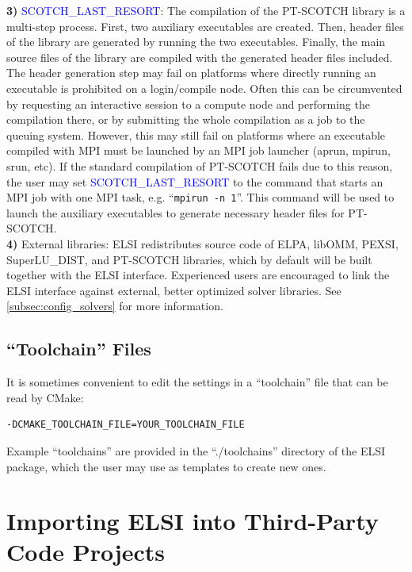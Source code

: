 \documentclass{report}
\begin{document}
\textbf{3)} \textcolor{blue}{SCOTCH\_LAST\_RESORT}:  The compilation of the PT-SCOTCH library is a multi-step process.  First, two auxiliary executables are created.  Then, header files of the library are generated by running the two executables.  Finally, the main source files of the library are compiled with the generated header files included.  The header generation step may fail on platforms where directly running an executable is prohibited on a login/compile node.  Often this can be circumvented by requesting an interactive session to a compute node and performing the compilation there, or by submitting the whole compilation as a job to the queuing system.  However, this may still fail on platforms where an executable compiled with MPI must be launched by an MPI job launcher (aprun, mpirun, srun, etc).  If the standard compilation of PT-SCOTCH fails due to this reason, the user may set \textcolor{blue}{SCOTCH\_LAST\_RESORT} to the command that starts an MPI job with one MPI task, e.g. ``\verb+mpirun -n 1+''.  This command will be used to launch the auxiliary executables to generate necessary header files for PT-SCOTCH.\\

\textbf{4)} External libraries:  ELSI redistributes source code of ELPA, libOMM, PEXSI, SuperLU\_DIST, and PT-SCOTCH libraries, which by default will be built together with the ELSI interface.  Experienced users are encouraged to link the ELSI interface against external, better optimized solver libraries.  See \ref{subsec:config_solvers} for more information.\\

\subsection{``Toolchain'' Files}
\label{subsec:config_toolchain}
It is sometimes convenient to edit the settings in a ``toolchain'' file that can be read by CMake:
\begin{verbatim}
-DCMAKE_TOOLCHAIN_FILE=YOUR_TOOLCHAIN_FILE
\end{verbatim}

Example ``toolchains'' are provided in the ``./toolchains'' directory of the ELSI package, which the user may use as templates to create new ones.\\

\section{Importing ELSI into Third-Party Code Projects}
\label{sec:import}
\end{document}
